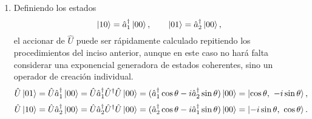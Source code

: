 \documentclass{scrartcl}
\renewcommand{\a}{\hat{a}}
\DeclareRobustCommand{\[}{\begin{equation}}
\DeclareRobustCommand{\]}{\end{equation}}
\begin{document}
\begin{enumerate}
\begin{enumerate}
    
        \item Definiendo los estados
        \[ \ket{10} = \a_1^\dagger \ket{00}, \quad \quad \ket{01} = \a_2^\dagger \ket{00}, \]
        el accionar de $\hat U$ puede ser rápidamente calculado repitiendo los procedimientos del inciso anterior, aunque en este caso no hará falta considerar una exponencial generadora de estados coherentes, sino un operador de creación individual.
        \[ \hat U \ket{01} = \hat U \a_1^\dagger \ket{00} = \hat U \a_1^\dagger \hat U^\dagger \hat U \ket{00} = (\a_1^\dagger \cos\theta - i \a_2^\dagger \sin\theta) \ket{00} = \ket{\cos\theta, \ -i \sin\theta}, \]
        \[ \hat U \ket{10} = \hat U \a_2^\dagger \ket{00} = \hat U \a_2^\dagger \hat U^\dagger \hat U \ket{00} = (\a_2^\dagger \cos\theta - i \a_1^\dagger \sin\theta) \ket{00} = \ket{-i \sin\theta, \ \cos\theta}. \]
    
    \end{enumerate}
    
\end{enumerate}
\end{document}

